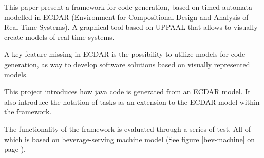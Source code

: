 This paper present a framework for code generation, based on timed automata
modelled in ECDAR (Environment for Compositional Design and Analysis of Real
Time Systems). A graphical tool based on UPPAAL that allows to visually create
models of real-time systems.

A key feature missing in ECDAR is the possibility to utilize models for code
generation, as way to develop software solutions based on visually represented
models.

This project introduces how java code is generated from an ECDAR model. It also
introduce the notation of tasks as an extension to the ECDAR model within the
framework.

The functionality of the framework is evaluated through a series of test. All of
which is based on beverage-serving machine model (See figure \ref{bev-machine}
on page \pageref{bev-machine}).


